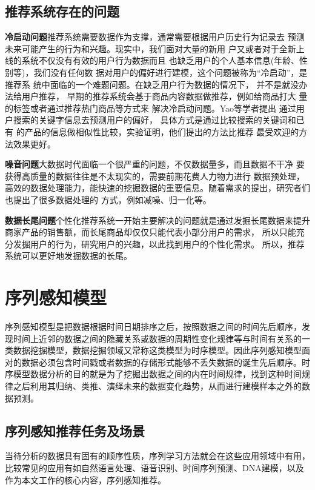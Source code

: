 \subsection{推荐系统存在的问题}

\textbf{冷启动问题}推荐系统需要数据作为支撑，通常需要根据用户历史行为记录去%
预测未来可能产生的行为和兴趣。现实中，我们面对大量的新用%
户又或者对于全新上线的系统不仅没有有效的用户行为数据而且%
也缺乏用户的个人基本信息(年龄、性别等)，我们没有任何数%
据对用户的偏好进行建模，这个问题被称为“冷启动”，是推荐系%
统中面临的一个难题问题。在缺乏用户行为数据的情况下，%
并不是就没办法给用户推荐，
早期的推荐系统会基于商品内容数据做推荐，例如给商品打大%
量的标签或者通过推荐热门商品等方式来%
解决冷启动问题。Yao等学者提出%
通过用户搜索的关键字信息去预测用户的偏好，%
具体方式是通过比较搜索的关键词和已有%
的产品的信息做相似性比较，实验证明，他们提出的方法比推荐%
最受欢迎的方法效果更好。

\textbf{噪音问题}大数据时代面临一个很严重的问题，不仅数据量多，而且数据不干净%
要获得高质量的数据往往是不太现实的，需要前期花费人力物力进行%
数据预处理，高效的数据处理能力，能快速的挖掘数据的重要信息。随着需求的提出，研究者们也提出了很多数据处理的%
方式，例如减噪、归一化等。

\textbf{数据长尾问题}个性化推荐系统一开始主要解决的问题就是通过发掘长尾数据来提升%
商家产品的销售额，而长尾商品却仅仅只能代表小部分用户的需求，%
所以只能充分发掘用户的行为，研究用户的兴趣，以此找到用户的个性化需求。%
所以，推荐系统可以更好地发掘数据的长尾。


\section{序列感知模型}
序列感知模型是把数据根据时间日期排序之后，按照数据之间的时间先后顺序，发现时间上近邻的数据之间的隐藏关系或数据的周期性变化规律等与时间有关系的一类数据挖掘模型，数据挖掘领域又常称这类模型为时序模型。因此序列感知模型面对的数据必须包含时间戳或者数据的存储形式能够不丢失数据的诞生先后顺序。时序模型数据分析的目的就是为了挖掘出数据之间的内在时间规律，找到这种时间规律之后利用其归纳、类推、演绎未来的数据变化趋势，从而进行建模样本之外的数据预测。


\subsection{序列感知推荐任务及场景}

当待分析的数据具有固有的顺序性质，序列学习方法就会在这些应用领域中有用，比较常见的应用有如自然语言处理、语音识别、时间序列预测、DNA建模，以及作为本文工作的核心内容，序列感知推荐。


